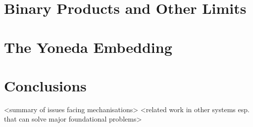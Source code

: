 \documentclass[twoside,titlepage,11pt]{article}
\begin{document}
\section{Binary Products and Other Limits}%
\section{The Yoneda Embedding}%
\section{Conclusions}%
<summary of issues facing mechanisations>
<related work in other systems esp. that can solve major foundational problems>


\end{document}
